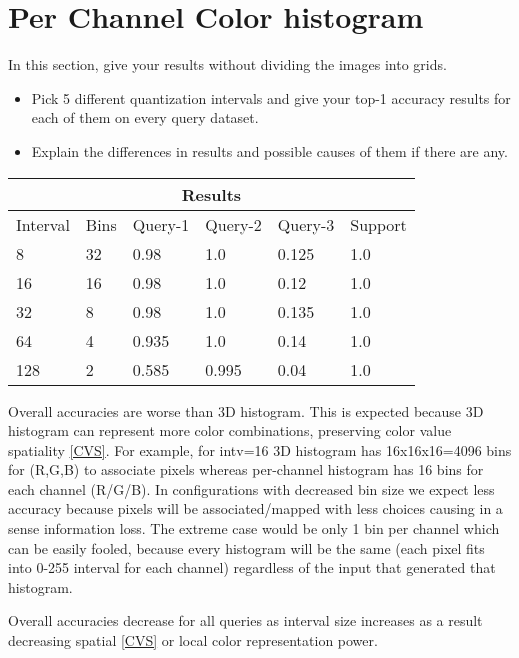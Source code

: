 \documentclass[12pt]{article}
\begin{document}
\section{Per Channel Color histogram}
In this section, give your results without dividing the images into grids.

\begin{itemize}
\item Pick 5 different quantization intervals and give your top-1 accuracy results for each of them on every query dataset.
\item Explain the differences in results and possible causes of them if there are any.
\end{itemize}

\begin{tabular}{ |p{1.5cm}|p{1.5cm}||p{2cm}|p{2cm}|p{2cm}|p{2cm}|  }
    \hline
    \multicolumn{6}{|c|}{Results} \\
    \hline
    Interval & Bins & Query-1 & Query-2 & Query-3 & Support \\
    \hline
    8 & 32 & 0.98 & 1.0 & 0.125 & 1.0 \\
    \hline
    16 & 16 & 0.98 & 1.0 & 0.12 & 1.0 \\
    \hline
    32 & 8 & 0.98 & 1.0 & 0.135 & 1.0 \\
    \hline
    64 & 4 & 0.935 & 1.0 & 0.14 & 1.0 \\
    \hline
    128 & 2 & 0.585 & 0.995 & 0.04 & 1.0 \\
    \hline
\end{tabular}

\vspace{1cm}

Overall accuracies are worse than 3D histogram. This is expected because
3D histogram can represent more color combinations, preserving color value spatiality \ref{CVS}.
For example, for intv=16 3D histogram has 16x16x16=4096 bins for (R,G,B) to associate pixels
whereas per-channel histogram has 16 bins for each channel (R/G/B). In configurations with decreased bin size
we expect less accuracy because pixels will be associated/mapped with less choices
causing in a sense information loss. The extreme case would be only 1 bin per channel
which can be easily fooled, because every histogram will be the same 
(each pixel fits into 0-255 interval for each channel) regardless of the input 
that generated that histogram.

Overall accuracies decrease for all queries as interval size increases 
as a result decreasing spatial \ref{CVS} or local color representation power.
\end{document}
